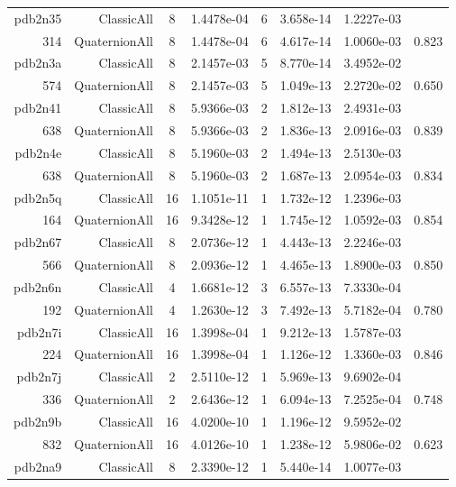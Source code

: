 \begin{xltabular}{\textwidth}{r|rcS[table-format=1.4e+2]cS[table-format=1.3e+2]S[table-format=1.4e+2]S[table-format=-1.3]}
pdb2n35 & ClassicAll & 8 & 1.4478e-04 & 6 & 3.658e-14 & 1.2227e-03 & \\
314 & QuaternionAll & 8 & 1.4478e-04 & 6 & 4.617e-14 & 1.0060e-03 & 0.823\\  \addlinespace
pdb2n3a & ClassicAll & 8 & 2.1457e-03 & 5 & 8.770e-14 & 3.4952e-02 & \\
574 & QuaternionAll & 8 & 2.1457e-03 & 5 & 1.049e-13 & 2.2720e-02 & 0.650\\  \addlinespace
pdb2n41 & ClassicAll & 8 & 5.9366e-03 & 2 & 1.812e-13 & 2.4931e-03 & \\
638 & QuaternionAll & 8 & 5.9366e-03 & 2 & 1.836e-13 & 2.0916e-03 & 0.839\\  \addlinespace
pdb2n4e & ClassicAll & 8 & 5.1960e-03 & 2 & 1.494e-13 & 2.5130e-03 & \\
638 & QuaternionAll & 8 & 5.1960e-03 & 2 & 1.687e-13 & 2.0954e-03 & 0.834\\  \addlinespace
pdb2n5q & ClassicAll & 16 & 1.1051e-11 & 1 & 1.732e-12 & 1.2396e-03 & \\
164 & QuaternionAll & 16 & 9.3428e-12 & 1 & 1.745e-12 & 1.0592e-03 & 0.854\\  \addlinespace
pdb2n67 & ClassicAll & 8 & 2.0736e-12 & 1 & 4.443e-13 & 2.2246e-03 & \\
566 & QuaternionAll & 8 & 2.0936e-12 & 1 & 4.465e-13 & 1.8900e-03 & 0.850\\  \addlinespace
pdb2n6n & ClassicAll & 4 & 1.6681e-12 & 3 & 6.557e-13 & 7.3330e-04 & \\
192 & QuaternionAll & 4 & 1.2630e-12 & 3 & 7.492e-13 & 5.7182e-04 & 0.780\\  \addlinespace
pdb2n7i & ClassicAll & 16 & 1.3998e-04 & 1 & 9.212e-13 & 1.5787e-03 & \\
224 & QuaternionAll & 16 & 1.3998e-04 & 1 & 1.126e-12 & 1.3360e-03 & 0.846\\  \addlinespace
pdb2n7j & ClassicAll & 2 & 2.5110e-12 & 1 & 5.969e-13 & 9.6902e-04 & \\
336 & QuaternionAll & 2 & 2.6436e-12 & 1 & 6.094e-13 & 7.2525e-04 & 0.748\\  \addlinespace
pdb2n9b & ClassicAll & 16 & 4.0200e-10 & 1 & 1.196e-12 & 9.5952e-02 & \\
832 & QuaternionAll & 16 & 4.0126e-10 & 1 & 1.238e-12 & 5.9806e-02 & 0.623\\  \addlinespace
pdb2na9 & ClassicAll & 8 & 2.3390e-12 & 1 & 5.440e-14 & 1.0077e-03 & \\

\end{xltabular}
